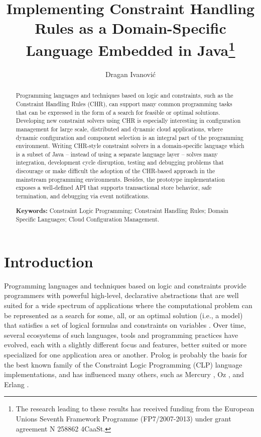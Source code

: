 \documentclass[runningheads,a4paper,11pt,dvipsname]{llncs}
\title{Implementing Constraint Handling Rules as a Domain-Specific
  Language Embedded in Java\thanks{The research leading to these results has received funding
    from the European Unions Seventh Framework Programme
    (FP7/2007-2013) under grant agreement N 258862 4CaaSt.
}
}
\author{Dragan Ivanovi\'c}
\institute{IMDEA Software Institute\\Madrid, Spain\\\texttt{dragan.ivanovic@imdea.org}}
\begin{document}
\maketitle

\begin{abstract}
  Programming languages and techniques based on logic and constraints,
  such as the Constraint Handling Rules (CHR), can support many common
  programming tasks that can be expressed in the form of a search for
  feasible or optimal solutions.  Developing new constraint solvers
  using CHR is especially interesting in configuration management for
  large scale, distributed and dynamic cloud applications, where
  dynamic configuration and component selection is an integral part of
  the programming environment.  Writing CHR-style constraint solvers
  in a domain-specific language which is a subset of Java -- instead
  of using a separate language layer -- solves many integration,
  development cycle disruption, testing and debugging problems that
  discourage or make difficult the adoption of the CHR-based approach
  in the mainstream programming environments.  Besides, the prototype
  implementation exposes a well-defined API that supports
  transactional store behavior, safe termination, and debugging via
  event notifications.  \smallskip
  \par\noindent\textbf{Keywords:} Constraint Logic Programming;
  Constraint Handling Rules; Domain Specific Languages; Cloud
  Configuration Management.
\end{abstract}

\section{Introduction}
\label{sec:introduction}

Programming languages and techniques based on logic and constraints
\cite{intro_constraints_stuckey} provide programmers with powerful
high-level, declarative abstractions that are well suited for a wide spectrum of applications
where the computational problem can be represented as a search for
some, all, or an optimal solution (i.e., a model) that satisfies a set
of logical formulas and constraints on variables \cite{Dechter03Constraints,Apt03}.
Over time, several ecosystems of such languages, tools and programming
practices have evolved, each with a slightly different focus and
features, better suited or more specialized for one application area
or another.  Prolog
\cite{SterlingShapiro94,bratko-short,hermenegildo10:ciao-design-tplp-tr}
is probably the basis for the best known family of the Constraint
Logic Programming (CLP) language implementations, and has influenced
many others, such as Mercury \cite{mercury-manual}, Oz
\cite{mozart-oz-tutorial}, and Erlang \cite{erlang}.
\end{document}

